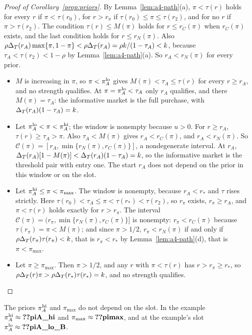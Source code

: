\begin{proof}[Proof of Corollary~\ref{prop:priors}]
By Lemma~\ref{lem:a4-path}(a), \(\pi<\tau(r)\) holds for every \(r\) if \(\pi<\tau(r_0)\), for \(r>r_\pi\) if
\(\tau(r_0)\le\pi\le\tau(r_2)\), and for no \(r\) if \(\pi>\tau(r_2)\). The condition \(\tau(r)\le M(\pi)\) holds for
\(r\le r_C(\pi)\) when \(r_C(\pi)\) exists, and the last condition holds for \(r\le r_N(\pi)\). Also
\(\rho\Delta_T(r_A)\max\{\pi,1-\pi\}<\rho\Delta_T(r_A)=\rho k/(1-\tau_A)<k\), because \(\tau_A<\tau(r_2)<1-\rho\) by
Lemma~\ref{lem:a4-path}(a). So \(r_A<r_N(\pi)\) for every prior.
\begin{itemize}[leftmargin=2.5em]
\item[(a)] \(M\) is increasing in \(\pi\), so \(\pi<\pi_A^{\rm lo}\) gives \(M(\pi)<\tau_A\le\tau(r)\) for every
\(r\ge r_A\), and no strength qualifies. At \(\pi=\pi_A^{\rm lo}<\tau_A\) only \(r_A\) qualifies, and there
\(M(\pi)=\tau_A\): the informative market is the full purchase, with \(\Delta_T(r_A)(1-\tau_A)=k\).
\item[(b)] Let \(\pi_A^{\rm lo}<\pi<\pi_A^{\rm hi}\); the window is nonempty because \(u>0\). For \(r\ge r_A\),
\(\tau(r)\ge\tau_A>\pi\). Also \(\tau_A<M(\pi)\) gives \(r_A<r_C(\pi)\), and \(r_A<r_N(\pi)\). So
\(\mathcal C(\pi)=[r_A,\min\{r_N(\pi),r_C(\pi)\}]\), a nondegenerate interval. At \(r_A\),
\(\Delta_T(r_A)[1-M(\pi)]<\Delta_T(r_A)(1-\tau_A)=k\), so the informative market is the threshold pair with entry one. The start
\(r_A\) does not depend on the prior in this window or on the slot.
\item[(c)] Let \(\pi_A^{\rm hi}\le\pi<\pi_{\max}\). The window is nonempty, because \(r_A<r_*\) and \(\tau\) rises
strictly. Here \(\tau(r_0)<\tau_A\le\pi<\tau(r_*)<\tau(r_2)\), so \(r_\pi\) exists, \(r_\pi\ge r_A\), and
\(\pi<\tau(r)\) holds exactly for \(r>r_\pi\). The interval \(\mathcal C(\pi)=(r_\pi,\min\{r_N(\pi),r_C(\pi)\}]\) is
nonempty: \(r_\pi<r_C(\pi)\) because \(\tau(r_\pi)=\pi<M(\pi)\); and since \(\pi>1/2\), \(r_\pi<r_N(\pi)\) if and only if
\(\rho\Delta_T(r_\pi)\tau(r_\pi)<k\), that is \(r_\pi<r_*\) by Lemma~\ref{lem:a4-path}(d), that is \(\pi<\pi_{\max}\).
\item[(d)] Let \(\pi\ge\pi_{\max}\). Then \(\pi>1/2\), and any \(r\) with \(\pi<\tau(r)\) has \(r>r_\pi\ge r_*\), so
\(\rho\Delta_T(r)\pi>\rho\Delta_T(r_*)\tau(r_*)=k\), and no strength qualifies.\qedhere
\end{itemize}
\end{proof}

The priors \(\pi_A^{\rm hi}\) and \(\pi_{\max}\) do not depend on the slot. In the example
\(\pi_A^{\rm hi}\approx\reg{piA_hi}\) and \(\pi_{\max}\approx\reg{pimax}\), and at the example's slot
\(\pi_A^{\rm lo}\approx\reg{piA_lo_B}\).

